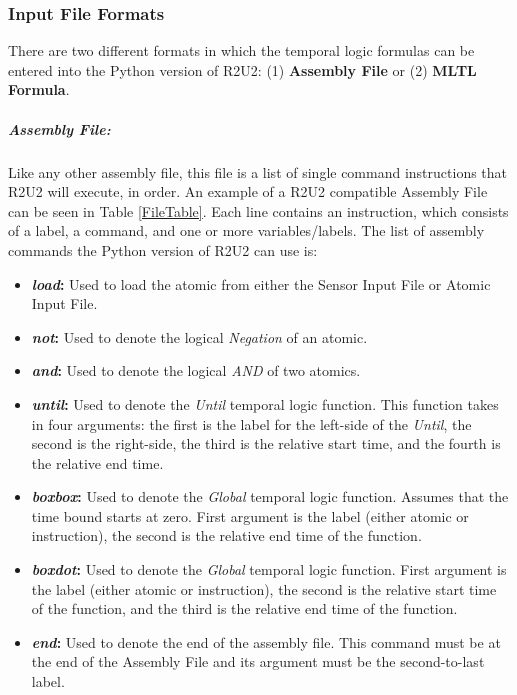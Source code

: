 \subsubsection{Input File Formats}
\label{InputFiles}
There are two different formats in which the temporal logic formulas can be entered into the Python version of R2U2: (1) \textbf{Assembly File} or (2) \textbf{MLTL Formula}.

\subparagraph{Assembly File:}
\label{AssemblyFile}
Like any other assembly file, this file is a list of single command instructions that R2U2 will execute, in order. An example of a R2U2 compatible Assembly File can be seen in Table \ref{FileTable}. Each line contains an instruction, which consists of a label, a command, and one or more variables/labels. The list of assembly commands the Python version of R2U2 can use is:
\begin{itemize}
	\item \textbf{\textit{load}:} Used to load the atomic from either the Sensor Input File or Atomic Input File. 
	\item \textbf{\textit{not}:} Used to denote the logical \textit{Negation} of an atomic.
	\item \textbf{\textit{and}:} Used to denote the logical \textit{AND} of two atomics.
	\item \textbf{\textit{until}:} Used to denote the \textit{Until} temporal logic function. This function takes in four arguments: the first is the label for the left-side of the \textit{Until}, the second is the right-side, the third is the relative start time, and the fourth is the relative end time.
	\item \textbf{\textit{boxbox}:} Used to denote the \textit{Global} temporal logic function. Assumes that the time bound starts at zero. First argument is the label (either atomic or instruction), the second is the relative end time of the function.
	\item \textbf{\textit{boxdot}:} Used to denote the \textit{Global} temporal logic function. First argument is the label (either atomic or instruction), the second is the relative start time of the function, and the third is the relative end time of the function.
	\item \textbf{\textit{end}:} Used to denote the end of the assembly file. This command must be at the end of the Assembly File and its argument must be the second-to-last label.
\end{itemize}

